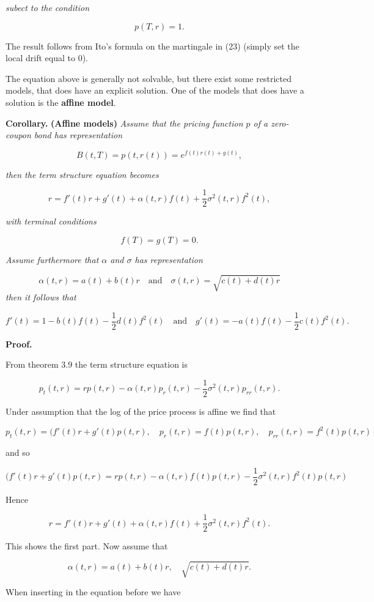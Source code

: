 \documentclass[a4paper,12pt,openany]{book}
\begin{document}
\emph{subect to the condition}

\[
p(T,r)=1.
\]

The result follows from Ito's formula on the martingale in (23) (simply set the local drift equal to 0).

The equation above is generally not solvable, but there exist some restricted models, that does have an explicit solution. One of the models that does have a solution is the \textbf{affine model}.

\textbf{Corollary.} \textbf{(Affine models)} \emph{Assume that the pricing function \(p\) of a zero-coupon bond has representation}

\[
B(t,T)=p(t,r(t))=e^{f(t)r(t)+g(t)},
\]

\emph{then the term structure equation becomes}

\[
r=f'(t)r+g'(t)+\alpha(t,r)f(t)+\frac{1}{2}\sigma^2(t,r)f^2(t),
\]

\emph{with terminal conditions}

\[
f(T)=g(T)=0.
\]

\emph{Assume furthermore that \(\alpha\) and \(\sigma\) has representation}

\[
\alpha(t,r)=a(t)+b(t)r\quad \text{and}\quad\sigma(t,r)=\sqrt{c(t)+d(t)r}
\]
\emph{then it follows that}

\[
f'(t)=1-b(t)f(t)-\frac{1}{2}d(t)f^2(t)\quad \text{and}\quad g'(t)=-a(t)f(t)-\frac{1}{2}c(t)f^2(t).
\]

\textbf{Proof.}

From theorem 3.9 the term structure equation is

\[
p_t(t,r)=rp(t,r)-\alpha(t,r)p_r(t,r)-\frac{1}{2}\sigma^2(t,r)p_{rr}(t,r).
\]

Under assumption that the log of the price process is affine we find that

\[
p_t(t,r)=(f'(t)r+g'(t)p(t,r),\quad p_r(t,r)=f(t)p(t,r),\quad p_{rr}(t,r)=f^2(t)p(t,r)
\]

and so

\[
(f'(t)r+g'(t)p(t,r)=rp(t,r)-\alpha(t,r)f(t)p(t,r)-\frac{1}{2}\sigma^2(t,r)f^2(t)p(t,r)
\]

Hence

\[
r=f'(t)r+g'(t)+\alpha(t,r)f(t)+\frac{1}{2}\sigma^2(t,r)f^2(t).
\]

This shows the first part. Now assume that

\[
\alpha(t,r)=a(t)+b(t)r,\quad\sqrt{c(t)+d(t)r}.
\]

When inserting in the equation before we have
\end{document}
